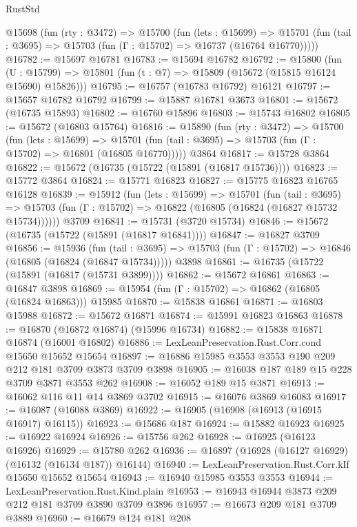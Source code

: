 \begin{lexlean}{RustStd}
\begin{coremodule}
  @15698
    (fun (rty : @3472) =>
    @15700
      (fun (lets : @15699) =>
      @15701 (fun (tail : @3695) => @15703 (fun (Γ : @15702) => @16737 (@16764 @16770)))))
@16782 := @15697 @16781
@16783 := @15694 @16782
@16792 := @15800
    (fun (U : @15799) => @15801 (fun (t : @7) => @15809 (@15672 (@15815 @16124 @15690) @15826)))
@16795 := @16757 (@16783 @16792) @16121
@16797 := @15657 @16782 @16792
@16799 := @15887 @16781 @3673
@16801 := @15672 (@16735 @15893)
@16802 := @16760 @15896
@16803 := @15743 @16802
@16805 := @15672 (@16803 @15764)
@16816 := @15890
    (fun (rty : @3472) =>
    @15700
      (fun (lets : @15699) =>
      @15701 (fun (tail : @3695) => @15703 (fun (Γ : @15702) => @16801 (@16805 @16770)))))
    @3864
@16817 := @15728 @3864
@16822 := @15672 (@16735 (@15722 (@15891 (@16817 @15736))))
@16823 := @15772 @3864
@16824 := @15771 @16823
@16827 := @15775 @16823 @16765 @16128
@16839 := @15912
    (fun (lets : @15699) =>
    @15701
      (fun (tail : @3695) =>
      @15703 (fun (Γ : @15702) => @16822 (@16805 (@16824 (@16827 @15732 @15734))))))
    @3709
@16841 := @15731 (@3720 @15734)
@16846 := @15672 (@16735 (@15722 (@15891 (@16817 @16841))))
@16847 := @16827 @3709
@16856 := @15936
    (fun (tail : @3695) => @15703 (fun (Γ : @15702) => @16846 (@16805 (@16824 (@16847 @15734)))))
    @3898
@16861 := @16735 (@15722 (@15891 (@16817 (@15731 @3899))))
@16862 := @15672 @16861
@16863 := @16847 @3898
@16869 := @15954 (fun (Γ : @15702) => @16862 (@16805 (@16824 @16863))) @15985
@16870 := @15838 @16861
@16871 := @16803 @15988
@16872 := @15672 @16871
@16874 := @15991 @16823 @16863
@16878 := @16870 (@16872 @16874) (@15996 @16734)
@16882 := @15838 @16871 @16874 (@16001 @16802)
@16886 := LexLeanPreservation.Rust.Corr.cond @15650 @15652 @15654
@16897 := @16886 @15985 @3553 @3553 @190 @209 @212 @181 @3709 @3873 @3709 @3898
@16905 := @16038 @187 @189 @15 @228 @3709 @3871 @3553 @262
@16908 := @16052 @189 @15 @3871
@16913 := @16062 @116 @11 @14 @3869 @3702
@16915 := @16076 @3869 @16083
@16917 := @16087 (@16088 @3869)
@16922 := @16905 (@16908 (@16913 (@16915 @16917) @16115))
@16923 := @15686 @187
@16924 := @15882 @16923
@16925 := @16922 @16924
@16926 := @15756 @262
@16928 := @16925 (@16123 @16926)
@16929 := @15780 @262
@16936 := @16897 (@16928 (@16127 @16929) (@16132 (@16134 @187)) @16144)
@16940 := LexLeanPreservation.Rust.Corr.kIf @15650 @15652 @15654
@16943 := @16940 @15985 @3553 @3553
@16944 := LexLeanPreservation.Rust.Kind.plain
@16953 := @16943 @16944 @3873 @209 @212 @181 @3709 @3890 @3709 @3896
@16957 := @16673 @209 @181 @3709 @3889
@16960 := @16679 @124 @181 @208

\end{coremodule}
\end{lexlean}
